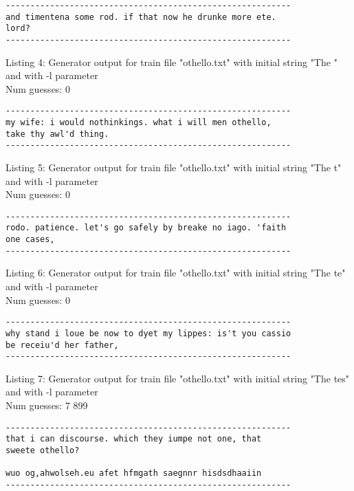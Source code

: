 \documentclass{article}
\begin{document}
\begin{lstlisting}
----------------------------------------------------------
and timentena some rod. if that now he drunke more ete. 
lord?
----------------------------------------------------------
\end{lstlisting}

Listing 4: Generator output for train file "othello.txt" with initial string "The " and with -l parameter
\\Num guesses: 0

\begin{lstlisting}
----------------------------------------------------------
my wife: i would nothinkings. what i will men othello, 
take thy awl'd thing.
----------------------------------------------------------
\end{lstlisting}

Listing 5: Generator output for train file "othello.txt" with initial string "The t" and with -l parameter
\\Num guesses: 0

\begin{lstlisting}
----------------------------------------------------------
rodo. patience. let's go safely by breake no iago. 'faith 
one cases,
----------------------------------------------------------
\end{lstlisting}

Listing 6: Generator output for train file "othello.txt" with initial string "The te" and with -l parameter
\\Num guesses: 0

\begin{lstlisting}
----------------------------------------------------------
why stand i loue be now to dyet my lippes: is't you cassio 
be receiu'd her father,
----------------------------------------------------------
\end{lstlisting}

Listing 7: Generator output for train file "othello.txt" with initial string "The tes" and with -l parameter
\\Num guesses: 7 899

\begin{lstlisting}
----------------------------------------------------------
that i can discourse. which they iumpe not one, that 
sweete othello?

wuo og,ahwolseh.eu afet hfmgath saegnnr hisdsdhaaiin
----------------------------------------------------------
\end{lstlisting}
\end{document}
